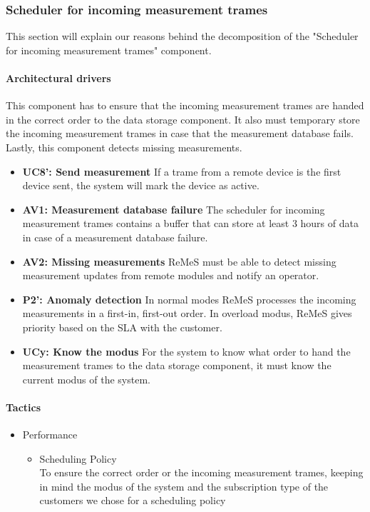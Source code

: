 \subsubsection{Scheduler for incoming measurement trames}
This section will explain our reasons behind the decomposition of 
the "Scheduler for incoming measurement trames" component.
\paragraph{Architectural drivers}
This component has to ensure that the incoming measurement trames are
handed in the correct order to the data storage component. It also must
temporary store the incoming measurement trames in case that the measurement
database fails. Lastly, this component detects missing measurements.
\begin{itemize}
	\item \textbf{UC8': Send measurement}
	If a trame from a remote device is the first device sent, the system will mark the device as active.	
	\item \textbf{AV1: Measurement database failure}
	The scheduler for incoming measurement trames contains a buffer that can
		store at least 3 hours of data in case of a measurement database failure.
	\item \textbf{AV2: Missing measurements}
	ReMeS must be able to detect missing measurement updates from remote modules and notify an operator.	
	\item \textbf{P2': Anomaly detection}
	In normal modes ReMeS processes the incoming measurements in a first-in, first-out order.
	In overload modus, ReMeS gives priority based on the SLA with the customer.
	\item \textbf{UCy: Know the modus}
	For the system to know what order to hand the measurement trames to the
		data storage component, it must know the current modus of the system.
\end{itemize}
\paragraph{Tactics}
\begin{itemize}
	\item{Performance}
	\begin{itemize}
		\item{Scheduling Policy} \\
		To ensure the correct order or the incoming measurement trames,
			keeping in mind the modus of the system and the subscription
			type of the customers we chose for a scheduling policy
	\end{itemize}
\end{itemize}
